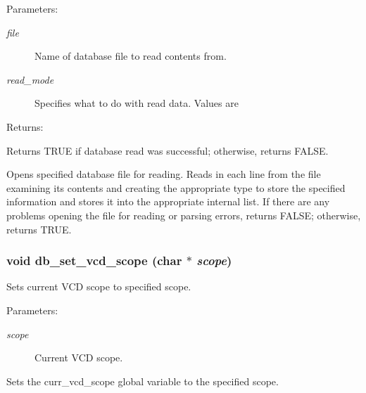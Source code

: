 \begin{Desc}
\item[Parameters: ]\par
\begin{description}
\item[{\em 
file}]Name of database file to read contents from. \item[{\em 
read\_\-mode}]Specifies what to do with read data. Values are
\end{description}
\end{Desc}
\begin{Desc}
\item[Returns: ]\par
Returns TRUE if database read was successful; otherwise, returns FALSE.\end{Desc}
Opens specified database file for reading. Reads in each line from the file examining its contents and creating the appropriate type to store the specified information and stores it into the appropriate internal list. If there are any problems opening the file for reading or parsing errors, returns FALSE; otherwise, returns TRUE. 
\subsubsection{\setlength{\rightskip}{0pt plus 5cm}void db\_\-set\_\-vcd\_\-scope (char $\ast$ {\em scope})}\label{db_8c_a28}


Sets current VCD scope to specified scope.

\begin{Desc}
\item[Parameters: ]\par
\begin{description}
\item[{\em 
scope}]Current VCD scope.\end{description}
\end{Desc}
Sets the curr\_\-vcd\_\-scope global variable to the specified scope. 
